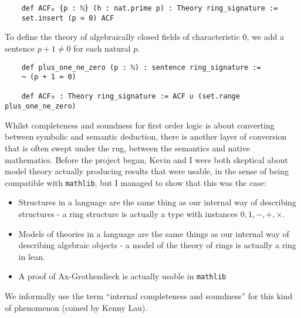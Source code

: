 \begin{dfn}
  \begin{lstlisting}
    def ACFₚ {p : ℕ} (h : nat.prime p) : Theory ring_signature :=
    set.insert (p ≃ 0) ACF\end{lstlisting}

  To define the theory of algebraically closed fields of characteristic $0$,
  we add a sentence $p + 1 \ne 0$ for each natural $p$.

  \begin{lstlisting}
    def plus_one_ne_zero (p : ℕ) : sentence ring_signature :=
    ¬ (p + 1 ≃ 0)

    def ACF₀ : Theory ring_signature := ACF ∪ (set.range plus_one_ne_zero)  \end{lstlisting}

\end{dfn}

  Whilst completeness and soundness for first order logic
  is about converting between symbolic and semantic deduction,
  there is another layer of conversion that is often swept under the rug,
  between the semantics and native mathematics.
  Before the project began,
  Kevin and I were both skeptical about model theory actually producing
  results that were usable, in the sense of being compatible with \texttt{mathlib},
  but I managed to show that this was the case:

  \begin{itemize}
    \item Structures in a language are the same thing
          as our internal way of describing structures -
          a ring structure is actually a type with instances $0,1,-,+,\times$.
    \item Models of theories in a language are the same things
          as our internal way of describing algebraic objects -
          a model of the theory of rings is actually a ring in lean.
    \item A proof of Ax-Grothendieck is actually usable in \texttt{mathlib}
  \end{itemize}

  We informally use the term ``internal completeness and soundness''
  for this kind of phenomenon (coined by Kenny Lau).

